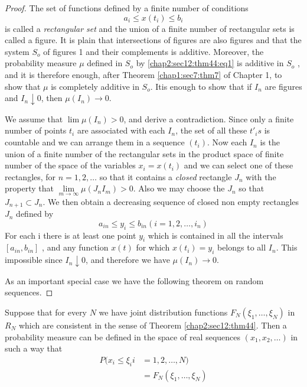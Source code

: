 \begin{proof}
The set of functions defined by a finite number of conditions
$$ 
a_i \leq x(t_i)\leq b_i 
$$
is called a \textit{rectangular set} and the union of a finite number of
rectangular sets is called a figure. It is plain that intersections of
figures are also figures and that the system $S_o$ of figures 1 and
their complements is additive. Moreover, the probability measure $\mu$
defined in $S_o$ by \ref{chap2:sec12:thm44:eq1} is additive in $S_o$ , and it is therefore
enough, after Theorem \ref{chap1:sec7:thm7} of Chapter 1, to show that $\mu$ is completely
additive in $S_o$. It\pageoriginale is enough to show that if $I_n$  are figures and
$I_n \downarrow 0$, then $\mu (I_n)\rightarrow 0$. 

We assume that $\lim \mu (I_n)>0$, and derive a contradiction. Since
only a finite number of points $t_i$ are associated with each $I_n$,
the set of all these $t'_{i}s$ is countable and we can arrange them in
a sequence $(t_i)$. Now each $I_n$ is the union of a finite number of
the rectangular sets in the product space of finite number of the
space of the variables $x_i = x(t_i)$ and we can select one of these
rectangles, for $n = 1, 2, \ldots$ so that it contains a \textit{closed}
rectangle $J_n$ with the property that $\lim\limits_{m\to\infty}\mu
(J_n I_m)>0$. Also we may choose the $J_n$ so that $J_{n+1}\subset
J_n$. We then obtain a decreasing sequence of closed non empty
rectangles $J_n$ defined by 
$$ 
a_{in}\leq y_{i} \leq b_{in} ( i = 1, 2, \dots,
i_n) 
$$ 
For each i there is at least one point $y_i$ which is contained in all
the intervals $[a_{in}, b_{in}]$ , and
any function $x(t)$ for which $x(t_i)=y_i$ belongs to all $I_n$. This
impossible since $ I_n \downarrow 0$, and therefore we have $\mu
(I_n)\rightarrow 0$. 

As an important special case we have the following theorem on random
sequences. 
\end{proof}

\begin{theorem}\label{chap2:sec12:thm45} %
  Suppose that for every $N$ we have joint distribution functions
  $F_N(\xi_1 , \ldots, \xi_N)$ in $R_N$ which are consistent in the sense
  of Theorem \ref{chap2:sec12:thm44}. Then a probability measure can
  be defined in the space 
  of real sequences $(x_1, x_2, \ldots)$ in such a way that 
  \begin{align*} 
    P(x_{i} \leq \xi_{i} i & = 1, 2, \ldots , N)\\
    &  = F_N(\xi_1, \ldots , \xi_N)
  \end{align*}
\end{theorem}

